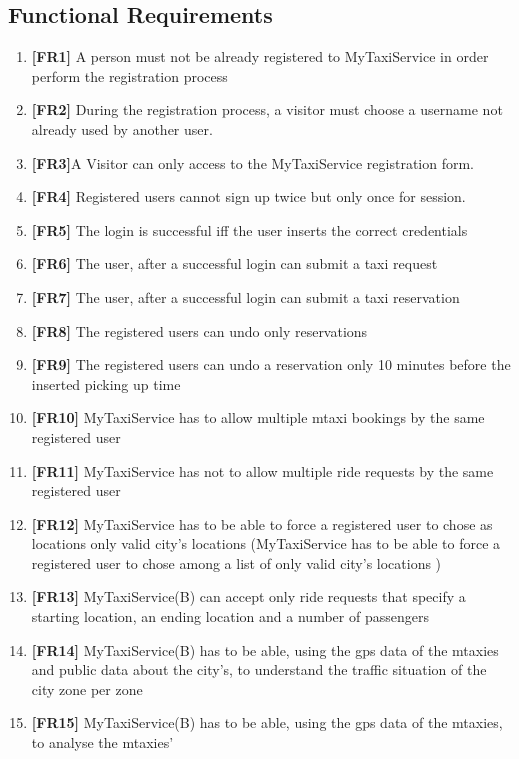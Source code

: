 \documentclass[11pt]{article} %
\begin{document}
    \subsection {Functional Requirements}
    	\begin{enumerate}
    	\item \textbf{[FR1]} A person must not be already registered to MyTaxiService in order perform the registration process
     	\item \textbf{[FR2]} During the registration process, a visitor must choose a username not already used by another user.
      	\item \textbf{[FR3]}A Visitor can only access to the MyTaxiService registration form.
      	\item \textbf{[FR4] }Registered users cannot sign up twice but only once for session.
      	\item \textbf{[FR5] }The login is successful iff the user inserts the correct credentials
      	\item \textbf{[FR6] }The user, after a successful login can submit a taxi request
      	\item \textbf{[FR7] }The user, after a successful login can submit a taxi reservation
      	\item \textbf{[FR8] }The registered users can undo only reservations
      	\item \textbf{[FR9] }The registered users can  undo a reservation only 10 minutes before the inserted
      		picking up time
      	\item \textbf{[FR10]} MyTaxiService has to allow multiple mtaxi bookings by the same registered user
      	\item \textbf{[FR11] }MyTaxiService has not to allow multiple ride requests by the same registered user
      	\item \textbf{[FR12]} MyTaxiService has to be able to force a registered user to chose as locations only valid city's locations
      		(MyTaxiService has to be able to force a registered user to chose among a list of only valid city's locations )
      	\item \textbf{[FR13] } MyTaxiService(B) can accept only ride requests that specify a starting location, an ending location
      		and a number of passengers
      	\item \textbf{[FR14] }MyTaxiService(B) has to be able, using the gps data of the mtaxies and public data about the city's, to understand the
      		traffic situation of the city zone per zone
      	\item \textbf{[FR15] }MyTaxiService(B) has to be able, using the gps data of the mtaxies, to analyse the mtaxies'

\end{enumerate}
\end{document}
